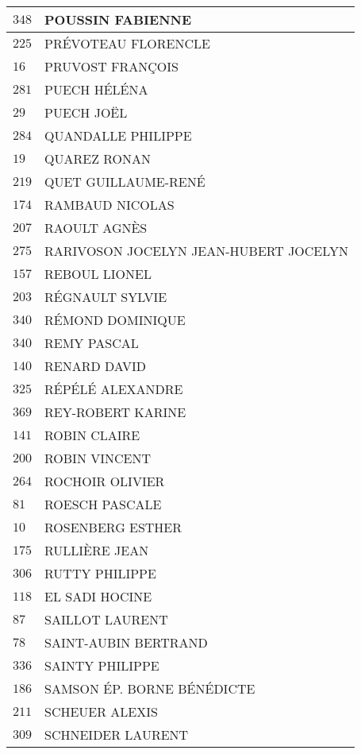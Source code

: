 \begin{xltabular}{\linewidth}{|l|X|}
    \hline
    $348$ & POUSSIN FABIENNE \\
    \hline
    $225$ & PRÉVOTEAU FLORENCLE \\
    \hline
    $16$ & PRUVOST FRANÇOIS \\
    \hline
    $281$ & PUECH HÉLÉNA \\
    \hline
    $29$ & PUECH JOËL \\
    \hline
    $284$ & QUANDALLE PHILIPPE \\
    \hline
    $19$ & QUAREZ RONAN \\
    \hline
    $219$ & QUET GUILLAUME-RENÉ \\
    \hline
    $174$ & RAMBAUD NICOLAS \\
    \hline
    $207$ & RAOULT AGNÈS \\
    \hline
    $275$ & RARIVOSON JOCELYN JEAN-HUBERT JOCELYN \\
    \hline
    $157$ & REBOUL LIONEL \\
    \hline
    $203$ & RÉGNAULT SYLVIE \\
    \hline
    $340$ & RÉMOND DOMINIQUE \\
    \hline
    $340$ & REMY PASCAL \\
    \hline
    $140$ & RENARD DAVID \\
    \hline
    $325$ & RÉPÉLÉ ALEXANDRE \\
    \hline
    $369$ & REY-ROBERT KARINE \\
    \hline
    $141$ & ROBIN CLAIRE \\
    \hline
    $200$ & ROBIN VINCENT \\
    \hline
    $264$ & ROCHOIR OLIVIER \\
    \hline
    $81$ & ROESCH PASCALE \\
    \hline
    $10$ & ROSENBERG ESTHER \\
    \hline
    $175$ & RULLIÈRE JEAN \\
    \hline
    $306$ & RUTTY PHILIPPE \\
    \hline
    $118$ & EL SADI HOCINE \\
    \hline
    $87$ & SAILLOT LAURENT \\
    \hline
    $78$ & SAINT-AUBIN BERTRAND \\
    \hline
    $336$ & SAINTY PHILIPPE \\
    \hline
    $186$ & SAMSON ÉP. BORNE BÉNÉDICTE \\
    \hline
    $211$ & SCHEUER ALEXIS \\
    \hline
    $309$ & SCHNEIDER LAURENT \\

\end{xltabular}
